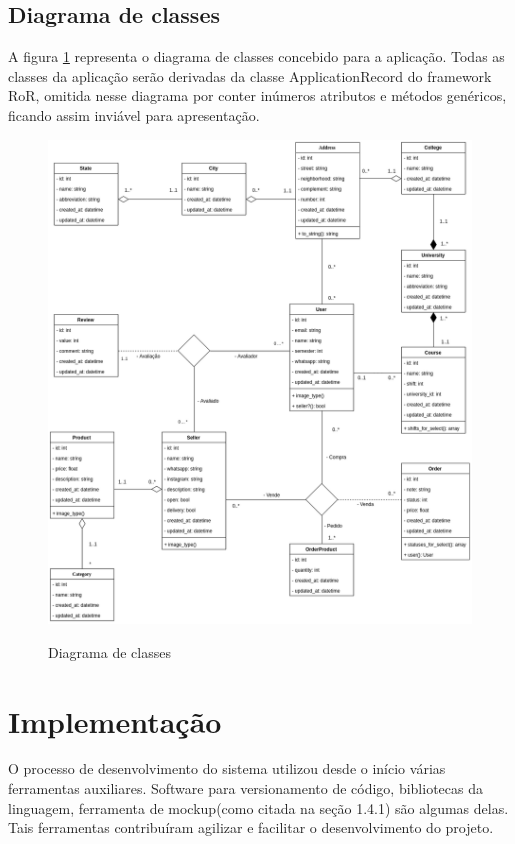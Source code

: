 \subsection{Diagrama de classes}
A figura \ref{fig:class} representa o diagrama de classes concebido para a aplicação. Todas as classes da aplicação serão derivadas da classe ApplicationRecord do framework RoR, omitida nesse diagrama por conter inúmeros atributos e métodos genéricos, ficando assim inviável para apresentação.
\begin{figure}[htbp!]
  \centering
  \caption{Diagrama de classes}
  \includegraphics[width=1\textwidth]{figs/class.png}
    \label{fig:class}
\end{figure}

\section{Implementação}
O processo de desenvolvimento do sistema utilizou desde o início várias ferramentas auxiliares. Software para versionamento de código, bibliotecas da linguagem, ferramenta de mockup(como citada na seção 1.4.1) são algumas delas. Tais ferramentas contribuíram agilizar e facilitar o desenvolvimento do projeto.
